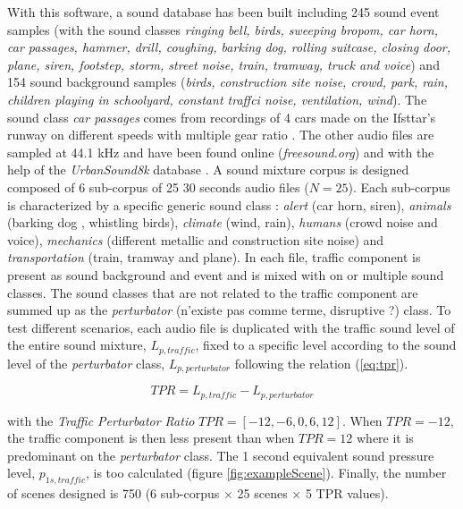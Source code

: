 \documentclass[twocolumn,a4paper,10pt]{article}
\begin{document}
With this software, a sound database has been built including 245 sound event samples (with the sound classes \textit{ringing bell, birds, sweeping bropom, car horn, car passages, hammer, drill, coughing, barking dog, rolling suitcase, closing door, plane, siren, footstep, storm, street noise, train, tramway, truck and voice}) and 154 sound background samples (\textit{birds, construction site noise, crowd, park, rain, children playing in schoolyard, constant traffci noise, ventilation, wind}). The sound class \textit{car passages} comes from recordings of 4 cars made on the Ifsttar's runway  on different speeds with multiple gear ratio \cite{gloaguen_creation_2017}. The other audio files are sampled at 44.1 kHz and have been found online (\textit{freesound.org}) and with the help of the \textit{UrbanSound8k} database \cite{salamon_dataset_nodate}. A sound mixture corpus is designed composed of 6 sub-corpus of 25 30 seconds audio files ($N = 25$). Each sub-corpus is characterized by a specific generic sound class : \textit{alert} (car horn, siren), \textit{animals} (barking dog , whistling birds), \textit{climate} (wind, rain), \textit{humans} (crowd noise and voice), \textit{mechanics} (different metallic and construction site noise) and \textit{transportation} (train, tramway and plane). In each file, traffic component is present as sound background and event and is mixed with on or multiple sound classes. The sound classes that are not related to the traffic component are summed up as the \textit{perturbator} (n'existe pas comme terme, disruptive ?) class. To test different scenarios, each audio file is duplicated with the traffic sound level of the entire sound mixture, $L_{p,traffic}$, fixed to a specific level according to the sound level of the \textit{perturbator} class, $L_{p,perturbator}$ following the relation (\ref{eq:tpr}). 

\begin{equation}\label{eq:tpr}
TPR = L_{p,traffic}-L_{p,perturbator}
\end{equation}

with the \textit{Traffic Perturbator Ratio} $TPR = \left[-12, -6, 0, 6, 12\right]$. When $TPR = -12$, the traffic component is then less present than when $TPR = 12$ where it is predominant on the \textit{perturbator} class. The 1 second equivalent sound pressure level, $p_{1s,traffic}$, is too calculated (figure \ref{fig:exampleScene}). Finally, the number of scenes designed is 750 (6 sub-corpus $\times$ 25 scenes $\times$  5 TPR values). 
\end{document}
